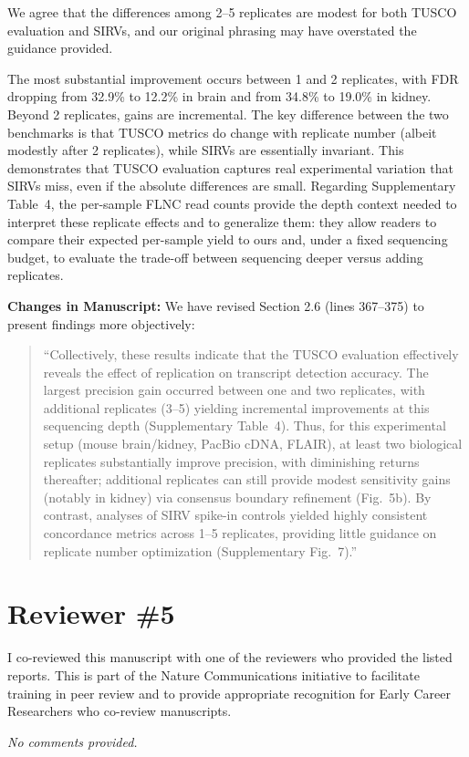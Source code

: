 \documentclass[11pt]{article}
\newcommand{\tuscoEvaluation}{TUSCO evaluation}
\begin{document}
\begin{responseboxnew}
We agree that the differences among 2--5 replicates are modest for both TUSCO evaluation and SIRVs, and our original phrasing may have overstated the guidance provided.

The most substantial improvement occurs between 1 and 2 replicates, with FDR dropping from 32.9\% to 12.2\% in brain and from 34.8\% to 19.0\% in kidney. Beyond 2 replicates, gains are incremental. The key difference between the two benchmarks is that TUSCO metrics do change with replicate number (albeit modestly after 2 replicates), while SIRVs are essentially invariant. This demonstrates that TUSCO evaluation captures real experimental variation that SIRVs miss, even if the absolute differences are small. Regarding Supplementary Table~4, the per-sample FLNC read counts provide the depth context needed to interpret these replicate effects and to generalize them: they allow readers to compare their expected per-sample yield to ours and, under a fixed sequencing budget, to evaluate the trade-off between sequencing deeper versus adding replicates.

\vspace{0.3cm}
\textbf{Changes in Manuscript:} We have revised Section 2.6 (lines 367--375) to present findings more objectively:

\begin{quote}
``Collectively, these results indicate that the \tuscoEvaluation{} effectively reveals the effect of replication on transcript detection accuracy. The largest precision gain occurred between one and two replicates, with additional replicates (3--5) yielding incremental improvements at this sequencing depth (Supplementary Table~4). Thus, for this experimental setup (mouse brain/kidney, PacBio cDNA, FLAIR), at least two biological replicates substantially improve precision, with diminishing returns thereafter; additional replicates can still provide modest sensitivity gains (notably in kidney) via consensus boundary refinement (Fig.~5b). By contrast, analyses of SIRV spike-in controls yielded highly consistent concordance metrics across 1--5 replicates, providing little guidance on replicate number optimization (Supplementary Fig.~7).''
\end{quote}
\end{responseboxnew}

\newpage

\section{Reviewer \#5}

\begin{positiveremarks}
I co-reviewed this manuscript with one of the reviewers who provided the listed reports. This is part of the Nature Communications initiative to facilitate training in peer review and to provide appropriate recognition for Early Career Researchers who co-review manuscripts.
\end{positiveremarks}

\textit{No comments provided.}
\end{document}
